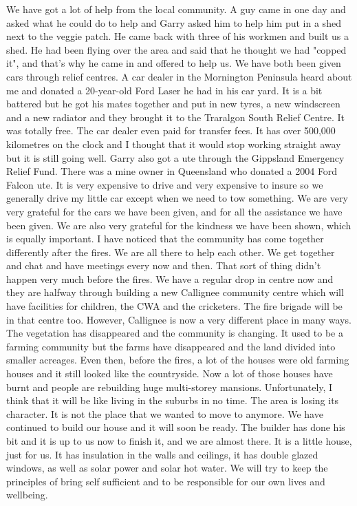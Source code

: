\documentclass[a4paper]{article}
\begin{document}
        We have got a lot of help from the local community. A guy came in one day and asked what he could do to help and Garry asked him to help him put in a shed next to the veggie patch. He came back with three of his workmen and built us a shed. He had been flying over the area and said that he thought we had "copped it", and that's why he came in and offered to help us.
        We have both been given cars through relief centres. A car dealer in the Mornington Peninsula heard about me and donated a 20-year-old Ford Laser he had in his car yard. It is a bit battered but he got his mates together and put in new tyres, a new windscreen and a new radiator and they brought it to the Traralgon South Relief Centre. It was totally free. The car dealer even paid for transfer fees. It has over 500,000 kilometres on the clock and I thought that it would stop working straight away but it is still going well.
        Garry also got a ute through the Gippsland Emergency Relief Fund. There was a mine owner in Queensland who donated a 2004 Ford Falcon ute. It is very expensive to drive and very expensive to insure so we generally drive my little car except when we need to tow something. We are very very grateful for the cars we have been given, and for all the assistance we have been given. We are also very grateful for the kindness we have been shown, which is equally important.
        I have noticed that the community has come together differently after the fires. We are all there to help each other. We get together and chat and have meetings every now and then. That sort of thing didn't happen very much before the fires. We have a regular drop in centre now and they are halfway through building a new Callignee community centre which will have facilities for children, the CWA and the cricketers. The fire brigade will be in that centre too.
        However, Callignee is now a very different place in many ways. The vegetation has disappeared and the community is changing. It used to be a farming community but the farms have disappeared and the land divided into smaller acreages. Even then, before the fires, a lot of the houses were old farming houses and it still looked like the countryside. Now a lot of those houses have burnt and people are rebuilding huge multi-storey mansions. Unfortunately, I think that it will be like living in the suburbs in no time. The area is losing its character. It is not the place that we wanted to move to anymore.
        We have continued to build our house and it will soon be ready. The builder has done his bit and it is up to us now to finish it, and we are almost there. It is a little house, just for us. It has insulation in the walls and ceilings, it has double glazed windows, as well as solar power and solar hot water. We will try to keep the principles of bring self sufficient and to be responsible for our own lives and wellbeing.
\end{document}
